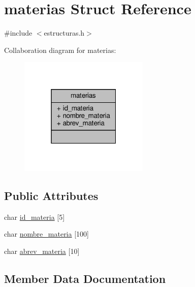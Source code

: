 \hypertarget{structmaterias}{}\section{materias Struct Reference}
\label{structmaterias}


{\ttfamily \#include $<$estructuras.\+h$>$}



Collaboration diagram for materias\+:\nopagebreak
\begin{figure}[H]
\begin{center}
\leavevmode
\includegraphics[width=175pt]{structmaterias__coll__graph}
\end{center}
\end{figure}
\subsection*{Public Attributes}
\begin{DoxyCompactItemize}
\item 
char \mbox{\hyperlink{structmaterias_ae285579bc06c3da15f087e1c1b829068}{id\+\_\+materia}} \mbox{[}5\mbox{]}
\item 
char \mbox{\hyperlink{structmaterias_a5d39a4c56dcd41b1cdc9873c5873400e}{nombre\+\_\+materia}} \mbox{[}100\mbox{]}
\item 
char \mbox{\hyperlink{structmaterias_a3cbb90c8931ebfaa78e3c26679845746}{abrev\+\_\+materia}} \mbox{[}10\mbox{]}
\end{DoxyCompactItemize}


\subsection{Member Data Documentation}
\mbox{\label{structmaterias_a3cbb90c8931ebfaa78e3c26679845746}} 
